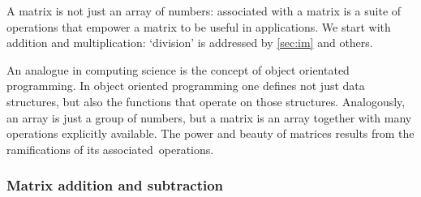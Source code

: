 A matrix is not just an array of numbers: associated with a matrix is a suite of operations that empower a matrix to be useful in applications.
We start with addition and multiplication: `division' is addressed by \autoref{sec:im} and others.

An analogue in computing science is the concept of object orientated programming.
In object oriented programming one defines not just data structures, but also the functions that operate on those structures.
Analogously, an array is just a group of numbers, but a matrix is an array together with many operations explicitly available. 
The power and beauty of matrices results from the ramifications of its associated~operations.


\subsubsection{Matrix addition and subtraction}

